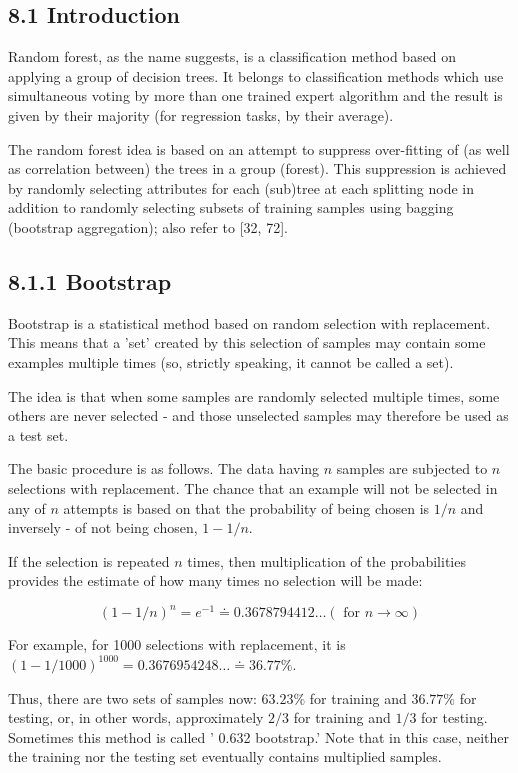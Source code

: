\documentclass[10pt]{book}
\begin{document}
\subsection*{8.1 Introduction}
Random forest, as the name suggests, is a classification method based on applying a group of decision trees. It belongs to classification methods which use simultaneous voting by more than one trained expert algorithm and the result is given by their majority (for regression tasks, by their average).

The random forest idea is based on an attempt to suppress over-fitting of (as well as correlation between) the trees in a group (forest). This suppression is achieved by randomly selecting attributes for each (sub)tree at each splitting node in addition to randomly selecting subsets of training samples using bagging (bootstrap aggregation); also refer to [32, 72].

\subsection*{8.1.1 Bootstrap}
Bootstrap is a statistical method based on random selection with replacement. This means that a 'set' created by this selection of samples may contain some examples multiple times (so, strictly speaking, it cannot be called a set).

The idea is that when some samples are randomly selected multiple times, some others are never selected - and those unselected samples may therefore be used as a test set.

The basic procedure is as follows. The data having $n$ samples are subjected to $n$ selections with replacement. The chance that an example will not be selected in any of $n$ attempts is based on that the probability of being chosen is $1 / n$ and inversely - of not being chosen, $1-1 / n$.

If the selection is repeated $n$ times, then multiplication of the probabilities provides the estimate of how many times no selection will be made:


\begin{equation*}
(1-1 / n)^{n}=e^{-1} \doteq 0.3678794412 \ldots(\text { for } n \rightarrow \infty) \tag{8.1}
\end{equation*}


For example, for 1000 selections with replacement, it is $(1-1 / 1000)^{1000}= 0.3676954248 \ldots \doteq 36.77 \%$.

Thus, there are two sets of samples now: $63.23 \%$ for training and $36.77 \%$ for testing, or, in other words, approximately $2 / 3$ for training and $1 / 3$ for testing. Sometimes this method is called ' 0.632 bootstrap.' Note that in this case, neither the training nor the testing set eventually contains multiplied samples.
\end{document}
